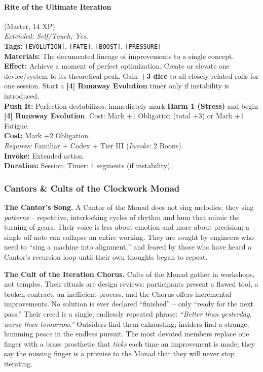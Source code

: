 \paragraph{Rite of the Ultimate Iteration} (Master, 14 XP) \hfill \\
\emph{Extended; Self/Touch; Yes.} \\
\textbf{Tags:} \texttt{[EVOLUTION]}, \texttt{[FATE]}, \texttt{[BOOST]}, \texttt{[PRESSURE]} \\
\textbf{Materials:} The documented lineage of improvements to a single concept. \\
\textbf{Effect:} Achieve a moment of perfect optimization. Create or elevate one device/system to its theoretical peak. Gain \textbf{+3 dice} to all closely related rolls for one session. Start a \textbf{[4] Runaway Evolution} timer only if instability is introduced. \\
\textbf{Push It:} Perfection destabilizes: immediately mark \textbf{Harm 1 (Stress)} and begin \textbf{[4] Runaway Evolution}. Cost: Mark +1 Obligation (total +3) or Mark +1 Fatigue. \\
\textbf{Cost:} Mark +2 Obligation. \\
\textit{Requires:} Familiar + Codex + Tier III (\textit{Invoke:} 2 Boons). \\
\textbf{Invoke:} Extended action. \\
\textbf{Duration:} Session; Timer: 4 segments (if instability).

\subsubsection*{Cantors \& Cults of the Clockwork Monad}

\textbf{The Cantor's Song.} A Cantor of the Monad does not sing melodies; they sing \textit{patterns} -- repetitive, interlocking cycles of rhythm and hum that mimic the turning of gears. Their voice is less about emotion and more about precision; a single off-note can collapse an entire working. They are sought by engineers who need to ``sing a machine into alignment,'' and feared by those who have heard a Cantor's recursion loop until their own thoughts began to repeat.

\textbf{The Cult of the Iteration Chorus.} Cults of the Monad gather in workshops, not temples. Their rituals are design reviews: participants present a flawed tool, a broken contract, an inefficient process, and the Chorus offers incremental improvements. No solution is ever declared ``finished'' -- only ``ready for the next pass.'' Their creed is a single, endlessly repeated phrase: \textit{``Better than yesterday, worse than tomorrow.''} Outsiders find them exhausting; insiders find a strange, humming peace in the endless pursuit. The most devoted members replace one finger with a brass prosthetic that \textit{ticks} each time an improvement is made; they say the missing finger is a promise to the Monad that they will never stop iterating.

